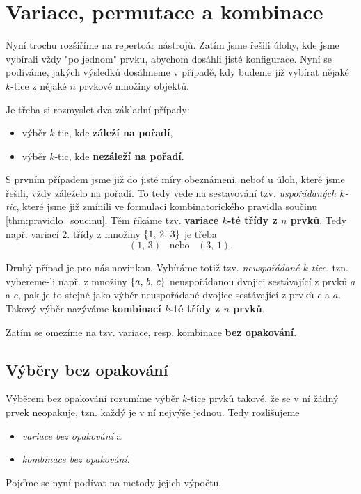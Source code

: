 \section{Variace, permutace a kombinace}

Nyní trochu rozšíříme na repertoár nástrojů. Zatím jsme řešili úlohy, kde jsme vybírali vždy "po jednom" prvku, abychom dosáhli jisté konfigurace. Nyní se podíváme, jakých výsledků dosáhneme v případě, kdy budeme již vybírat nějaké $k$-tice z nějaké $n$ prvkové množiny objektů.\par
Je třeba si rozmyslet dva základní případy:
\begin{itemize}
    \item výběr $k$-tic, kde \textbf{záleží na pořadí},
    \item výběr $k$-tic, kde \textbf{nezáleží na pořadí}.
\end{itemize}
S prvním případem jsme již do jisté míry obeznámeni, neboť u úloh, které jsme řešili, vždy záleželo na pořadí. To tedy vede na sestavování tzv. \emph{uspořádaných $k$-tic}, které jsme již zmínili ve formulaci kombinatorického pravidla součinu \ref{thm:pravidlo_soucinu}. Těm říkáme tzv. \textbf{variace $k$-té třídy z $n$ prvků}. Tedy např. variací 2. třídy z množiny $\left\{1,\,2,\,3\right\}$ je třeba
\begin{equation*}
    (1,\,3)\;\;\;\text{nebo}\;\;\;(3,\,1).
\end{equation*}

Druhý případ je pro nás novinkou. Vybíráme totiž tzv. \emph{neuspořádané $k$-tice}, tzn. vybereme-li např. z množiny $\left\{a,\,b,\,c\right\}$ neuspořádanou dvojici sestávající z prvků $a$ a $c$, pak je to stejné jako výběr neuspořádané dvojice sestávající z prvků $c$ a $a$. Takový výběr nazýváme \textbf{kombinací $k$-té třídy z $n$ prvků}.

Zatím se omezíme na tzv. variace, resp. kombinace \textbf{bez opakování}.

\subsection{Výběry bez opakování}

Výběrem bez opakování rozumíme výběr $k$-tice prvků takové, že se v ní žádný prvek neopakuje, tzn. každý je v ní nejvýše jednou. Tedy rozlišujeme
\begin{itemize}
    \item \emph{variace bez opakování} a
    \item \emph{kombinace bez opakování}.
\end{itemize}
Pojďme se nyní podívat na metody jejich výpočtu.

